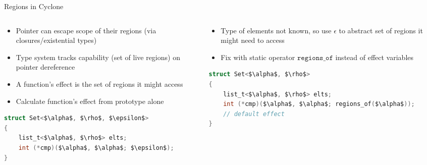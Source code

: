 \documentclass[aspectratio=169]{beamer}
\begin{document}
\begin{frame}[fragile]{Regions in Cyclone}
\footnotesize{
  \begin{columns}[T]
    \begin{column}{0.48\textwidth}
    \begin{itemize}
        \item Pointer can escape scope of their regions (via closures/existential types)
        \item Type system tracks \alert{capability} (set of live regions) on pointer dereference %
        \item A function's \alert{effect} is the set of regions it might access
        \item Calculate function's effect from prototype alone
    \end{itemize}
    \begin{lstlisting}[language=C,mathescape,basicstyle={\footnotesize\ttfamily}]
struct Set<$\alpha$, $\rho$, $\epsilon$>
{
    list_t<$\alpha$, $\rho$> elts;
    int (*cmp)($\alpha$, $\alpha$; $\epsilon$);
}
\end{lstlisting}
    \end{column}

    \begin{column}{0.48\textwidth}
        \begin{itemize}
        \item Type of elements not known, so use $\epsilon$ to abstract set of regions it might need to access
        \item Fix with static operator $\texttt{regions\_of}$ instead of effect variables %
        \end{itemize}
        \vspace{0.6in}
\begin{lstlisting}[language=C,mathescape,basicstyle={\footnotesize\ttfamily}]
struct Set<$\alpha$, $\rho$>
{
    list_t<$\alpha$, $\rho$> elts;
    int (*cmp)($\alpha$, $\alpha$; regions_of($\alpha$));
    // default effect
}
\end{lstlisting}
    \end{column}
  \end{columns}
  }
\end{frame}
\end{document}
